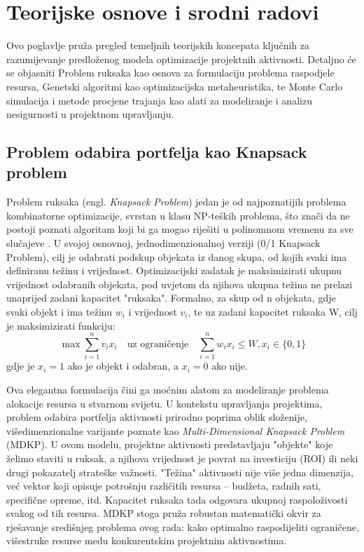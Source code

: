 \section{Teorijske osnove i srodni radovi}
\label{chap:teorija}

Ovo poglavlje pruža pregled temeljnih teorijskih koncepata ključnih za razumijevanje predloženog modela optimizacije projektnih aktivnosti. Detaljno će se objasniti Problem ruksaka kao osnova za formulaciju problema raspodjele resursa, Genetski algoritmi kao optimizacijska metaheuristika, te Monte Carlo simulacija i metode procjene trajanja kao alati za modeliranje i analizu nesigurnosti u projektnom upravljanju.

\subsection{Problem odabira portfelja kao Knapsack problem}

Problem ruksaka (engl. \textit{Knapsack Problem}) jedan je od najpoznatijih problema kombinatorne optimizacije, svrstan u klasu NP-teških problema, što znači da ne postoji poznati algoritam koji bi ga mogao riješiti u polinomnom vremenu za sve slučajeve \cite{GareyJohnson1979, Kellerer2004}. U svojoj osnovnoj, jednodimenzionalnoj verziji (0/1 Knapsack Problem), cilj je odabrati podskup objekata iz danog skupa, od kojih svaki ima definiranu težinu i vrijednost. Optimizacijski zadatak je maksimizirati ukupnu vrijednost odabranih objekata, pod uvjetom da njihova ukupna težina ne prelazi unaprijed zadani kapacitet "ruksaka". Formalno, za skup od n objekata, gdje svaki objekt i ima težinu $w_i$ i vrijednost $v_i$, te uz zadani kapacitet ruksaka W, cilj je maksimizirati funkciju:
$$
\max \sum_{i=1}^n v_i x_i \quad \text{uz ograničenje} \quad \sum_{i=1}^n w_i x_i \leq W, x_i \in \{0,1\}
$$
gdje je $x_i=1$ ako je objekt i odabran, a $x_i=0$ ako nije.


Ova elegantna formulacija čini ga moćnim alatom za modeliranje problema alokacije resursa u stvarnom svijetu. U kontekstu upravljanja projektima, problem odabira portfelja aktivnosti prirodno poprima oblik složenije, višedimenzionalne varijante poznate kao \textit{Multi-Dimensional Knapsack Problem} (MDKP). U ovom modelu, projektne aktivnosti predstavljaju "objekte" koje želimo staviti u ruksak, a njihova vrijednost je povrat na investiciju (ROI) ili neki drugi pokazatelj strateške važnosti. "Težina" aktivnosti nije više jedna dimenzija, već vektor koji opisuje potrošnju različitih resursa – budžeta, radnih sati, specifične opreme, itd. Kapacitet ruksaka tada odgovara ukupnoj raspoloživosti svakog od tih resursa. MDKP stoga pruža robustan matematički okvir za rješavanje središnjeg problema ovog rada: kako optimalno raspodijeliti ograničene, višestruke resurse među konkurentskim projektnim aktivnostima.

